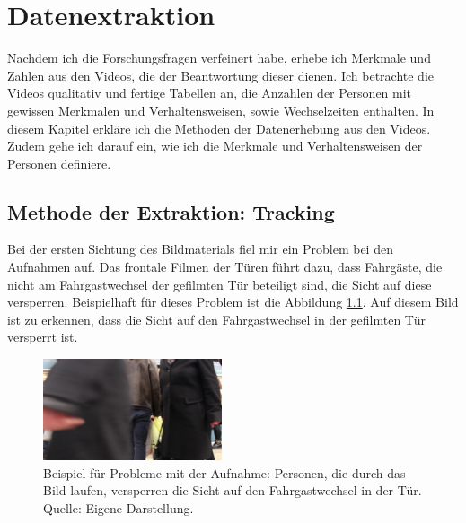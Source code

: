 \chapter{Datenextraktion} \label{Datenerhebung}
Nachdem ich die Forschungsfragen verfeinert habe, erhebe ich Merkmale und Zahlen aus den Videos, die der Beantwortung dieser dienen. Ich betrachte die Videos qualitativ und fertige Tabellen an, die Anzahlen der Personen mit gewissen Merkmalen und Verhaltensweisen, sowie Wechselzeiten enthalten. In diesem Kapitel erkläre ich die Methoden der Datenerhebung aus den Videos. Zudem gehe ich darauf ein, wie ich die Merkmale und Verhaltensweisen der Personen definiere.
\section{Methode der Extraktion: Tracking}\label{Tracking}
Bei der ersten Sichtung des Bildmaterials fiel mir ein Problem bei den Aufnahmen auf. Das frontale Filmen der Türen führt dazu, dass Fahrgäste, die nicht am Fahrgastwechsel der gefilmten Tür beteiligt sind, die Sicht auf diese versperren. Beispielhaft für dieses Problem ist die Abbildung \ref{fig:Problem bei Videos}. Auf diesem Bild ist zu erkennen, dass die Sicht auf den Fahrgastwechsel in der gefilmten Tür versperrt ist.
\begin{figure}[H]
	\centering
		\includegraphics[width=0.47\textwidth]{pictures/data_extraction/tracking/problem.jpg}
	\caption{Beispiel für Probleme mit der Aufnahme: Personen, die durch das Bild laufen, versperren die Sicht auf den Fahrgastwechsel in der Tür. Quelle: Eigene Darstellung.}
	\label{fig:Problem bei Videos}
\end{figure} 
